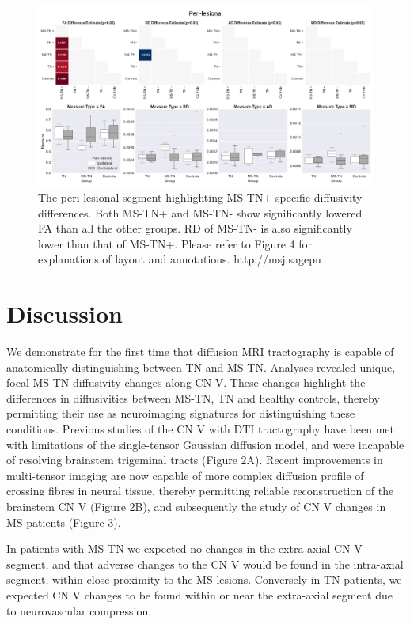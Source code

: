 \begin{figure}[p]
\includegraphics[width=\textwidth]{figure7.png}
\caption{The peri-lesional segment highlighting MS-TN+ specific diffusivity differences. Both MS-TN+ and MS-TN- show significantly lowered FA than all the other groups. RD of MS-TN- is also significantly lower than that of MS-TN+. Please refer to Figure 4 for explanations of layout and annotations.
http://msj.sagepu}
\centering
\label{fig:MSfigure7}
\end{figure}

\section{Discussion}

We demonstrate for the first time that diffusion MRI tractography is capable of anatomically distinguishing between TN and MS-TN. Analyses revealed unique, focal MS-TN diffusivity changes along CN V. These changes highlight the differences in diffusivities between MS-TN, TN and healthy controls, thereby permitting their use as neuroimaging signatures for distinguishing these conditions. 
Previous studies of the CN V with DTI tractography have been met with limitations of the single-tensor Gaussian diffusion model, and were incapable of resolving brainstem trigeminal tracts (Figure 2A). Recent improvements in multi-tensor imaging are now capable of more complex diffusion profile of crossing fibres in neural tissue, thereby permitting reliable reconstruction of the brainstem CN V (Figure 2B), and subsequently the study of CN V changes in MS patients (Figure 3). 

In patients with MS-TN we expected no changes in the extra-axial CN V segment, and that adverse changes to the CN V would be found in the intra-axial segment, within close proximity to the MS lesions. Conversely in TN patients, we expected CN V changes to be found within or near the extra-axial segment due to neurovascular compression. 

